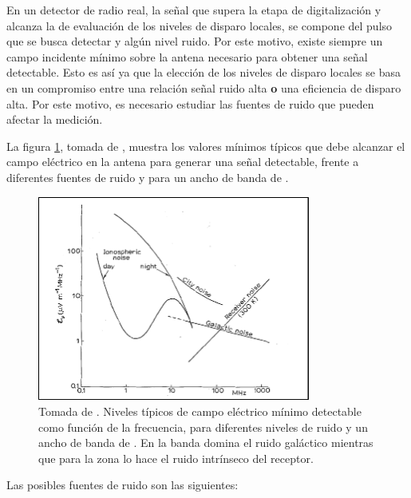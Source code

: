 	En un detector de radio real, la se\~nal que supera la etapa de digitalizaci\'on y alcanza la de evaluaci\'on de los niveles de disparo locales, se compone del pulso que se busca detectar y alg\'un nivel ruido.
	Por este motivo, existe siempre un campo incidente m\'inimo sobre la antena necesario para obtener una se\~nal detectable. 
	Esto es as\'i ya que la elecci\'on de los niveles de disparo locales se basa en un compromiso entre una relaci\'on se\~nal ruido alta \textbf{o} una eficiencia de disparo alta.
	Por este motivo, es necesario estudiar las fuentes de ruido que pueden afectar la medici\'on.
	
	La figura \ref{fig:allanNoise}, tomada de \cite{allan1971}, muestra los valores m\'inimos t\'ipicos que debe alcanzar el campo el\'ectrico en la antena para generar una se\~nal detectable, frente a diferentes fuentes de ruido y para un ancho de banda de .
	\begin{figure}[ht!]
		\centering
		\includegraphics[width=0.8\textwidth]{./fig/simulacionRadio/allanNoise}
		\caption{\label{fig:allanNoise}
		Tomada de \cite{allan1971}. Niveles t\'ipicos de campo el\'ectrico m\'inimo detectable como funci\'on de la frecuencia, para diferentes niveles de ruido y un ancho de banda de .
		En la banda  domina el ruido gal\'actico mientras que para la zona  lo hace el ruido intr\'inseco del receptor.
		}
	\end{figure}
	Las posibles fuentes de ruido son las siguientes:

